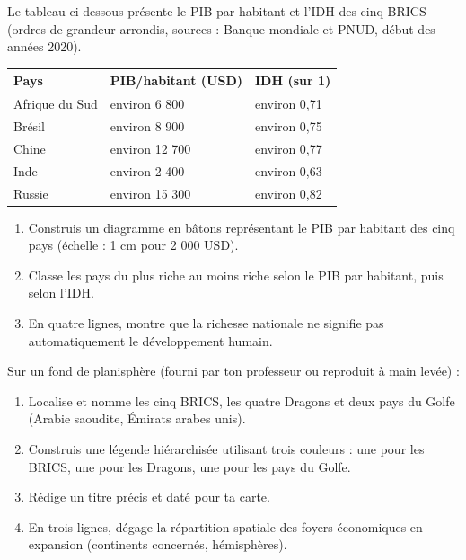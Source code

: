 \documentclass[11pt]{article}
\begin{document}
\begin{exercice}
Le tableau ci-dessous présente le PIB par habitant et l'IDH des cinq BRICS (ordres de grandeur arrondis, sources : Banque mondiale et PNUD, début des années 2020).

\begin{center}
\begin{tabularx}{\linewidth}{|l|X|X|}\hline
\rowcolor{popblueL} \textbf{Pays} & \textbf{PIB/habitant (USD)} & \textbf{IDH (sur 1)} \\ \hline
Afrique du Sud & environ 6 800 & environ 0,71 \\ \hline
Brésil & environ 8 900 & environ 0,75 \\ \hline
Chine & environ 12 700 & environ 0,77 \\ \hline
Inde & environ 2 400 & environ 0,63 \\ \hline
Russie & environ 15 300 & environ 0,82 \\ \hline
\end{tabularx}
\end{center}

\begin{enumerate}
\item Construis un diagramme en bâtons représentant le PIB par habitant des cinq pays (échelle : 1 cm pour 2 000 USD).
\item Classe les pays du plus riche au moins riche selon le PIB par habitant, puis selon l'IDH.
\item En quatre lignes, montre que la richesse nationale ne signifie pas automatiquement le développement humain.
\end{enumerate}
\end{exercice}

\begin{exercice}
Sur un fond de planisphère (fourni par ton professeur ou reproduit à main levée) :
\begin{enumerate}
\item Localise et nomme les cinq BRICS, les quatre Dragons et deux pays du Golfe (Arabie saoudite, Émirats arabes unis).
\item Construis une légende hiérarchisée utilisant trois couleurs : une pour les BRICS, une pour les Dragons, une pour les pays du Golfe.
\item Rédige un titre précis et daté pour ta carte.
\item En trois lignes, dégage la répartition spatiale des foyers économiques en expansion (continents concernés, hémisphères).
\end{enumerate}
\end{exercice}
\end{document}
